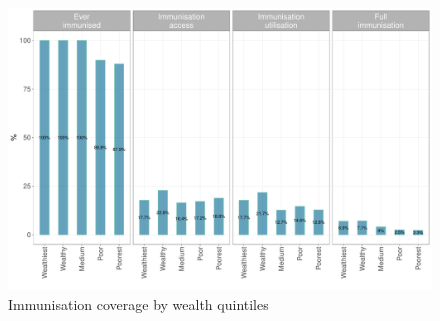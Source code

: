 \documentclass[12pt,a4paper]{article}
\begin{document}
\begin{figure}[H]

{\centering \includegraphics{kayahReport_files/figure-latex/epi2plot-1} 

}

\caption{Immunisation coverage by wealth quintiles}\label{fig:epi2plot}
\end{figure}
\end{document}
